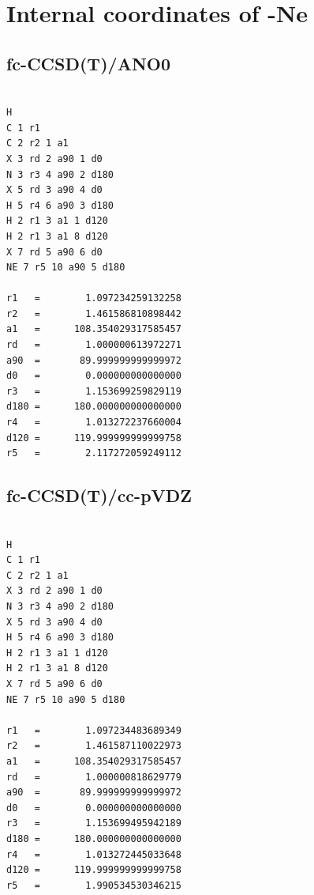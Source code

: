 \section{Internal coordinates of \texorpdfstring{\pan}{CH3CNH+} -Ne }

\subsection{fc-CCSD(T)/ANO0}

\begin{verbatim}

H
C 1 r1
C 2 r2 1 a1
X 3 rd 2 a90 1 d0
N 3 r3 4 a90 2 d180
X 5 rd 3 a90 4 d0
H 5 r4 6 a90 3 d180
H 2 r1 3 a1 1 d120
H 2 r1 3 a1 8 d120
X 7 rd 5 a90 6 d0
NE 7 r5 10 a90 5 d180

r1   =        1.097234259132258
r2   =        1.461586810898442
a1   =      108.354029317585457
rd   =        1.000000613972271
a90  =       89.999999999999972
d0   =        0.000000000000000
r3   =        1.153699259829119
d180 =      180.000000000000000
r4   =        1.013272237660004
d120 =      119.999999999999758
r5   =        2.117272059249112

\end{verbatim}

\subsection{fc-CCSD(T)/cc-pVDZ}
\begin{verbatim}

H
C 1 r1
C 2 r2 1 a1
X 3 rd 2 a90 1 d0
N 3 r3 4 a90 2 d180
X 5 rd 3 a90 4 d0
H 5 r4 6 a90 3 d180
H 2 r1 3 a1 1 d120
H 2 r1 3 a1 8 d120
X 7 rd 5 a90 6 d0
NE 7 r5 10 a90 5 d180

r1   =        1.097234483689349
r2   =        1.461587110022973
a1   =      108.354029317585457
rd   =        1.000000818629779
a90  =       89.999999999999972
d0   =        0.000000000000000
r3   =        1.153699495942189
d180 =      180.000000000000000
r4   =        1.013272445033648
d120 =      119.999999999999758
r5   =        1.990534530346215
\end{verbatim}
\newpage



